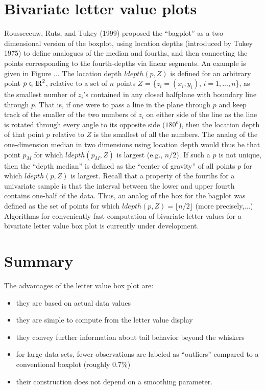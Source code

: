 \documentclass[oneside]{article}
\newcommand{\Reals}{{\rm I\kern-.1667em{}R}}
\begin{document}
\vspace{-14mm}
\section{Bivariate letter value plots}

Rousseeeuw, Ruts, and Tukey (1999) proposed the ``bagplot''
as a two-dimensional version of the boxplot, using location 
depths (introduced by Tukey 1975)
to define analogues of the median and fourths, and then
connecting the points corresponding to the fourth-depths 
via linear segments.  An example is given in Figure ...
The location depth $ldepth(p,Z)$ is defined for an arbitrary 
point $p \in \Reals^2$, relative to a set of $n$ points
$Z$ = \{$z_i = (x_i, y_i)$, $i = 1,...,n$\}, as 
the smallest number of $z_i$'s contained in
any closed halfplane with boundary line through $p$.
That is, if one were to pass a line in the plane through $p$
and keep track of the smaller of the two numbers of $z_i$ on 
either side of the line as the line is rotated through every
angle to its opposite side ($180^o$), then the location depth
of that point $p$ relative to $Z$ is the smallest of all the
numbers.  The analog of the one-dimension median in two
dimensions using location depth would thus be that point
$p_M$ for which $ldepth(p_M, Z)$ is largest (e.g., $n/2$).
If such a $p$ is not unique, then the ``depth median'' is
defined as the ``center of gravity'' of all points $p$ for
which $ldepth(p,Z)$ is largest.  Recall that a property
of the fourths for a univariate sample is that the 
interval between the lower and upper fourth contains
one-half of the data.  Thus, an analog of the box for
the bagplot was defined as the set of points for which
$ldepth(p,Z) = \lfloor n/2 \rfloor$ (more precisely,...)
Algorithms for conveniently fast computation of bivariate letter values 
for a bivariate letter value box plot 
is currently under development.
 



\vspace{-14mm}
\section{Summary}

The advantages of the letter value box plot are:
\begin{itemize}
\item 
they are based on actual data values 
\item
they are simple to compute from the letter value display
\item 
they convey further information about tail behavior beyond the whiskers
\item
for large data sets, fewer observations are labeled as ``outliers''
compared to a conventional boxplot (roughly 0.7\%)
\item their construction does not depend on a smoothing parameter.
\end{itemize} 
\end{document}
